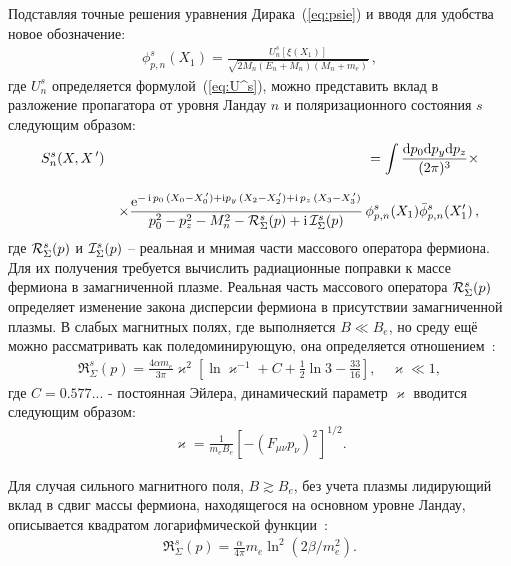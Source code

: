 Подставляя точные решения уравнения Дирака~(\ref{eq:psie}) и вводя для удобства новое обозначение:
\begin{eqnarray}
\phi^{s}_{p, n} (X_1) =   \frac{U^s_{n} [\xi(X_1)]}
{\sqrt{2 M_n (E_{n} + M_n)(M_n + m_e)}} \, ,
\label{eq:phi_psi}
\end{eqnarray}
%
\noindent где $U^s_{n}$ определяется формулой~(\ref{eq:U^s}), можно представить вклад в разложение пропагатора от уровня Ландау $n$ и поляризационного состояния $s$ следующим образом:
\begin{eqnarray}
\label{eq:propagator}
S^{s}_n (X, X^{\,\prime}) && =  \int \frac{\mathrm{d} p_0 \mathrm{d} p_y \mathrm{d} p_z}{(2\pi)^3} \times
\\[3mm]
\nonumber
&& \times \frac{\mathrm{e}^{- \, \mathrm{i} \,  p_0 \,(X_0 - X^{\,\prime}_0) + 
		\mathrm{i} p_y \,(X_2 - X^{\,\prime}_2) +  \mathrm{i} \,  p_z \,(X_3 - X^{\,\prime}_3)}}
{p_0^2 - p_z^2 - M_n^2 - {\cal R}^{s}_\Sigma (p) + \mathrm{i}\, {\cal I}^{s}_\Sigma (p)}
\, \phi^{s}_{p, n} (X_1) \bar \phi^{s}_{p, n} (X'_1) \, ,
\end{eqnarray}
где ${\cal R}^{s}_\Sigma (p)$ и ${\cal I}^{s}_\Sigma (p)$ -- реальная и мнимая части массового оператора фермиона.  Для их получения требуется вычислить радиационные поправки к массе фермиона в замагниченной плазме. Реальная часть массового оператора ${\cal R}^{s}_\Sigma (p)$ определяет изменение закона дисперсии фермиона в присутствии замагниченной плазмы. В слабых магнитных полях, где выполняется $B\ll B_e$, но среду ещё можно рассматривать как поледоминирующую, она определяется 
отношением~\cite{Ritus1969}:
%
\begin{eqnarray}
\label{eq:Re1}
\Re^{s}_\Sigma (p) = \frac{4\alpha m_e}{3\pi} \varkappa^2 \left [ \ln \varkappa^{-1} + C + \frac{1}{2} \ln 3 - \frac{33}{16} \right],\quad \varkappa\ll 1,
\end{eqnarray}
\noindent где $C = 0.577...$ - постоянная Эйлера, динамический параметр $\varkappa$ вводится следующим образом:
%
\begin{eqnarray}
\varkappa = \frac{1}{m_e B_e} [-(F_{\mu\nu} p_{\nu})^2]^{1/2}.
\end{eqnarray}
%

Для случая сильного магнитного поля, $B\gtrsim B_e$, без учета плазмы лидирующий вклад в  сдвиг массы фермиона, находящегося на основном уровне Ландау, описывается квадратом логарифмической функции~\cite{Jancovici:1969}:
\begin{eqnarray}
\label{eq:Re2}
\Re^{s}_\Sigma (p) = \frac{\alpha}{4\pi} m_e \ln^2 (2\beta/m_e^2).
\end{eqnarray}
%

